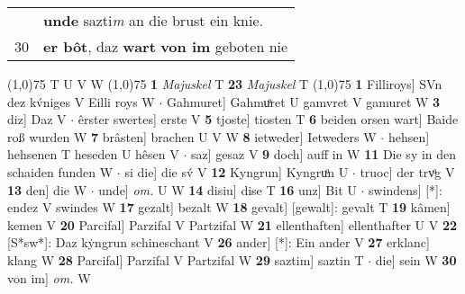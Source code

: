 \documentclass[8pt,a4paper,notitlepage]{article}
\begin{document}
\begin{table}[ht]
\begin{minipage}[t]{0.5\linewidth}
\begin{tabular}{rl}
 & \textbf{unde} sazti\textit{m} an die brust ein knie.\\ 
30 & \textbf{er bôt}, daz \textbf{wart} \textbf{von im} geboten nie\\ 
\end{tabular}
\scriptsize
\line(1,0){75} \newline
T U V W \newline
\line(1,0){75} \newline
\textbf{1} \textit{Majuskel} T  \textbf{23} \textit{Majuskel} T  \newline
\line(1,0){75} \newline
\textbf{1} Filliroys] SVn dez kv́niges V Eilli roys W  $\cdot$ Gahmuret] Gahmuͦret U gamvret V gamuret W \textbf{3} diz] Daz V  $\cdot$ êrster swertes] erste V \textbf{5} tjoste] tiosten T \textbf{6} beiden orsen wart] Baide roß wurden W \textbf{7} brâsten] brachen U V W \textbf{8} ietweder] Ietweders W  $\cdot$ hehsen] hehsenen T heseden U hêsen V  $\cdot$ saz] gesaz V \textbf{9} doch] auff in W \textbf{11} Die sy in den schaiden funden W  $\cdot$ si die] die sv́ V \textbf{12} Kyngrun] Kyngruͦn U  $\cdot$ truoc] der trvͦg V \textbf{13} den] die W  $\cdot$ unde] \textit{om.} U W \textbf{14} disiu] dise T \textbf{16} unz] Bit U  $\cdot$ swindens] [*]: endez V swindes W \textbf{17} gezalt] bezalt W \textbf{18} gevalt] [gewalt]: gevalt T \textbf{19} kâmen] kemen V \textbf{20} Parcifal] Parzifal V Partzifal W \textbf{21} ellenthaften] ellenthafter U V \textbf{22} [S*sw*]: Daz kẏngrun schineschant V \textbf{26} ander] [*]: Ein ander V \textbf{27} erklanc] klang W \textbf{28} Parcifal] Parzifal V Partzifal W \textbf{29} saztim] saztin T  $\cdot$ die] sein W \textbf{30} von im] \textit{om.} W \newline
\end{minipage}
\end{table}
\end{document}
